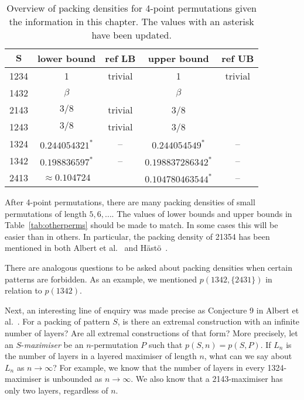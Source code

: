 \documentclass[12pt, a4paper, twoside]{report}
\begin{document}
\begin{table}[ht]
\centering
\begin{tabular}{|c | c | c | c | c|}
\hline
$\mathbf{S}$ & \textbf{lower bound} & \textbf{ref LB} & \textbf{upper bound} & \textbf{ref UB}\\
\hline\hline
1234 & 1 & trivial & 1 & trivial\\
\hline
1432 & $\beta$ & \cite{price1997packing} & $\beta$ & \cite{price1997packing}\\
\hline
2143 & $3/8$ & trivial & 3/8 & \cite{price1997packing}\\
\hline
1243 & $3/8$ & trivial & 3/8 & \cite{albert2002packing}\\
\hline
1324 & $0.244054321^*$ & -- & $0.244054549^*$ & -- \\
\hline
1342 & $0.198836597^*$ & --  & $0.198837286342^*$ & -- \\
\hline
2413 & $\approx 0.104724$ & \cite{presutti2010packing} & $0.104780463544^*$ & -- \\
\hline
\end{tabular}
\caption{\small{Overview of packing densities for 4-point permutations given the information in this chapter. The values with an asterisk have been updated.}}
\label{tab:updated}
\end{table}

After 4-point permutations, there are many packing densities of small permutations of length $5, 6,\ldots$. The values of lower bounds and upper bounds in Table~\ref{tab:otherperms} should be made to match. In some cases this will be easier than in others. In particular, the packing density of 21354 has been mentioned in both Albert et al.~\cite{albert2002packing} and H\"{a}st\"{o}~\cite{hasto2002packing}.

There are analogous questions to be asked about packing densities when certain patterns are forbidden. As an example, we mentioned $p(1342,\{2431\})$ in relation to $p(1342)$. 

Next, an interesting line of enquiry was made precise as Conjecture 9 in Albert et al.~\cite{albert2002packing}. For a packing of pattern $S$, is there an extremal construction with an infinite number of layers? Are all extremal constructions of that form? More precisely, let an $S$-\emph{maximiser} be an $n$-permutation $P$ such that $p(S,n) = p(S,P)$. If $L_n$ is the number of layers in a layered maximiser of length $n$, what can we say about $L_n$ as $n\to\infty$? For example, we know that the number of layers in every 1324-maximiser is unbounded as $n \to \infty$. We also know that a 2143-maximiser has only two layers, regardless of $n$.
\end{document}
